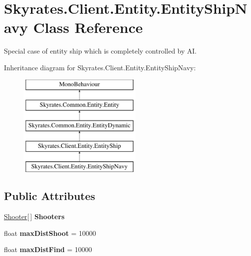 \hypertarget{class_skyrates_1_1_client_1_1_entity_1_1_entity_ship_navy}{\section{Skyrates.\-Client.\-Entity.\-Entity\-Ship\-Navy Class Reference}
\label{class_skyrates_1_1_client_1_1_entity_1_1_entity_ship_navy}
}


Special case of entity ship which is completely controlled by A\-I.  


Inheritance diagram for Skyrates.\-Client.\-Entity.\-Entity\-Ship\-Navy\-:\begin{figure}[H]
\begin{center}
\leavevmode
\includegraphics[height=5.000000cm]{class_skyrates_1_1_client_1_1_entity_1_1_entity_ship_navy}
\end{center}
\end{figure}
\subsection*{Public Attributes}
\begin{DoxyCompactItemize}
\item 
\hypertarget{class_skyrates_1_1_client_1_1_entity_1_1_entity_ship_navy_a3e716c406054959be4eee5b259eee3df}{\hyperlink{class_skyrates_1_1_client_1_1_mono_1_1_shooter}{Shooter}\mbox{[}$\,$\mbox{]} {\bfseries Shooters}}\label{class_skyrates_1_1_client_1_1_entity_1_1_entity_ship_navy_a3e716c406054959be4eee5b259eee3df}

\item 
\hypertarget{class_skyrates_1_1_client_1_1_entity_1_1_entity_ship_navy_a55c9aa1de27939eb381e0dca2409d26a}{float {\bfseries max\-Dist\-Shoot} = 10000}\label{class_skyrates_1_1_client_1_1_entity_1_1_entity_ship_navy_a55c9aa1de27939eb381e0dca2409d26a}

\item 
\hypertarget{class_skyrates_1_1_client_1_1_entity_1_1_entity_ship_navy_a881bed5b4ed777b3aa7b8982e79e5323}{float {\bfseries max\-Dist\-Find} = 10000}\label{class_skyrates_1_1_client_1_1_entity_1_1_entity_ship_navy_a881bed5b4ed777b3aa7b8982e79e5323}

\end{DoxyCompactItemize}
